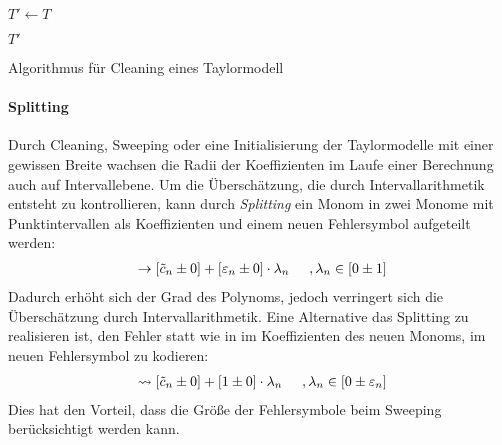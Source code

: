 \begin{algorithm}[H]
\label{algo:split}
\SetAlgoLined
{}
\DontPrintSemicolon
$T' \gets T$ 

\Return $T'$ 
 \caption{Algorithmus für Cleaning eines Taylormodell}
\end{algorithm}

    

\paragraph{Splitting}
Durch Cleaning, Sweeping oder eine Initialisierung der Taylormodelle mit einer gewissen Breite wachsen die Radii der Koeffizienten im Laufe einer Berechnung auch auf Intervallebene. Um die Überschätzung, die durch Intervallarithmetik entsteht zu kontrollieren, kann durch \textit{Splitting} ein Monom in zwei Monome mit Punktintervallen als Koeffizienten und einem neuen Fehlersymbol aufgeteilt werden:
\begin{align*}
[\tilde{c}_n \pm \varepsilon_n]\ \rightarrow [\tilde{c}_n \pm 0] + [\varepsilon_n \pm 0]\cdot  \lambda_n \hspace{0.5cm}, \lambda_n \in [0 \pm 1]
\end{align*}
Dadurch erhöht sich der Grad des Polynoms, jedoch verringert sich die Überschätzung durch Intervallarithmetik. Eine Alternative das Splitting zu realisieren ist, den Fehler statt wie in \cite{DBLP:conf/macis/BrausseKM15} im Koeffizienten des neuen Monoms, im neuen Fehlersymbol zu kodieren:
\begin{align*}
 [\tilde{c}_n \pm \varepsilon_n]\ \rightsquigarrow [\tilde{c}_n \pm 0] + [1 \pm 0]\cdot  \lambda_n \hspace{0.5cm}, \lambda_n \in [0 \pm \varepsilon_n]
\end{align*}
Dies hat den Vorteil, dass die Größe der Fehlersymbole beim Sweeping berücksichtigt werden kann.


